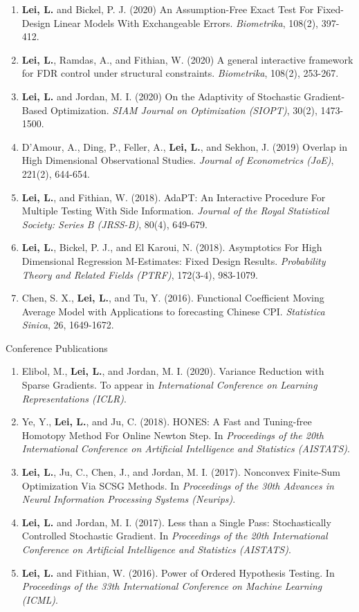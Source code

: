 \documentclass{article}
\begin{document}
\begin{enumerate}
\item \textbf{Lei, L.} and Bickel, P. J. (2020) An Assumption-Free Exact Test For Fixed-Design Linear Models With Exchangeable Errors. \emph{Biometrika}, 108(2), 397-412.
\item \textbf{Lei, L.}, Ramdas, A., and Fithian, W. (2020) A general interactive framework for FDR control under structural constraints. \emph{Biometrika}, 108(2), 253-267.
\item \textbf{Lei, L.} and Jordan, M. I. (2020) On the Adaptivity of Stochastic Gradient-Based Optimization. \emph{SIAM Journal on Optimization (SIOPT)}, 30(2), 1473-1500.
\item D'Amour, A., Ding, P., Feller, A., \textbf{Lei, L.}, and Sekhon, J. (2019) Overlap in High Dimensional Observational Studies. \emph{Journal of Econometrics (JoE)}, 221(2), 644-654.
\item \textbf{Lei, L.}, and Fithian, W. (2018). AdaPT: An Interactive Procedure For Multiple Testing With Side Information. \emph{Journal of the Royal Statistical Society: Series B (JRSS-B)}, 80(4), 649-679.
\item \textbf{Lei, L.}, Bickel, P. J., and El Karoui, N. (2018). Asymptotics For High Dimensional Regression M-Estimates: Fixed Design Results. \emph{Probability Theory and Related Fields (PTRF)}, 172(3-4), 983-1079.
\item Chen, S. X., \textbf{Lei, L.}, and Tu, Y. (2016). Functional Coefficient Moving Average Model with Applications to forecasting Chinese CPI. \emph{Statistica Sinica}, 26, 1649-1672.
\end{enumerate}

\begin{large}
\noindent Conference Publications
\end{large}

\begin{enumerate}
\item Elibol, M., \textbf{Lei, L.}, and Jordan, M. I. (2020). Variance Reduction with Sparse Gradients. To appear in \emph{International Conference on Learning Representations (ICLR)}.
\item Ye, Y., \textbf{Lei, L.}, and Ju, C. (2018). HONES: A Fast and Tuning-free Homotopy Method For Online Newton Step. In \emph{Proceedings of the 20th International Conference on Artificial Intelligence and Statistics (AISTATS)}.
\item \textbf{Lei, L.}, Ju, C., Chen, J., and Jordan, M. I. (2017). Nonconvex Finite-Sum Optimization Via SCSG Methods. In \emph{Proceedings of the 30th Advances in Neural Information Processing Systems (Neurips)}.
\item \textbf{Lei, L.} and Jordan, M. I. (2017). Less than a Single Pass: Stochastically Controlled Stochastic Gradient. In \emph{Proceedings of the 20th International Conference on Artificial Intelligence and Statistics (AISTATS)}.
\item \textbf{Lei, L.} and Fithian, W. (2016). Power of Ordered Hypothesis Testing. In \emph{Proceedings of the 33th International Conference on Machine Learning (ICML)}.
\end{enumerate}
\end{document}
